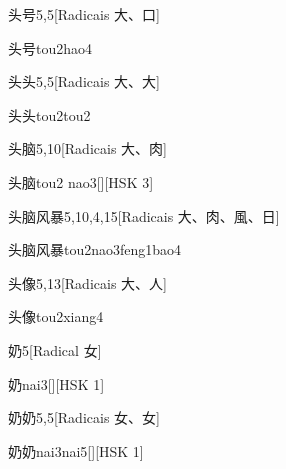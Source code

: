 \begin{entry}{头号}{5,5}[Radicais ⼤、⼝]
  \begin{phonetics}{头号}{tou2hao4}
  \end{phonetics}
\end{entry}

\begin{entry}{头头}{5,5}[Radicais ⼤、⼤]
  \begin{phonetics}{头头}{tou2tou2}
  \end{phonetics}
\end{entry}

\begin{entry}{头脑}{5,10}[Radicais ⼤、⾁]
  \begin{phonetics}{头脑}{tou2 nao3}[][HSK 3]
  \end{phonetics}
\end{entry}

\begin{entry}{头脑风暴}{5,10,4,15}[Radicais ⼤、⾁、⾵、⽇]
  \begin{phonetics}{头脑风暴}{tou2nao3feng1bao4}
  \end{phonetics}
\end{entry}

\begin{entry}{头像}{5,13}[Radicais ⼤、⼈]
  \begin{phonetics}{头像}{tou2xiang4}
  \end{phonetics}
\end{entry}

\begin{entry}{奶}{5}[Radical ⼥]
  \begin{phonetics}{奶}{nai3}[][HSK 1]
  \end{phonetics}
\end{entry}

\begin{entry}{奶奶}{5,5}[Radicais ⼥、⼥]
  \begin{phonetics}{奶奶}{nai3nai5}[][HSK 1]
  \end{phonetics}
\end{entry}

